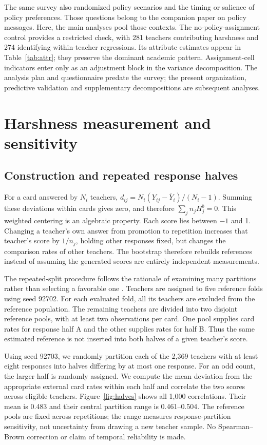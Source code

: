 The same survey also randomized policy scenarios and the timing or salience of policy preferences. Those questions belong to the companion paper on policy messages. Here, the main analyses pool those contexts. The no-policy-assignment control provides a restricted check, with 281 teachers contributing harshness and 274 identifying within-teacher regressions. Its attribute estimates appear in Table~\ref{tab:attr}; they preserve the dominant academic pattern. Assignment-cell indicators enter only as an adjustment block in the variance decomposition. The analysis plan and questionnaire predate the survey; the present organization, predictive validation and supplementary decompositions are subsequent analyses.

\section{Harshness measurement and sensitivity}\label{app:harshness}
\subsection{Construction and repeated response halves}
For a card answered by $N_i$ teachers, $d_{ij}=N_i(Y_{ij}-\overline Y_i)/(N_i-1)$. Summing these deviations within cards gives zero, and therefore $\sum_j n_jH^b_j=0$. This weighted centering is an algebraic property. Each score lies between $-1$ and 1. Changing a teacher's own answer from promotion to repetition increases that teacher's score by $1/n_j$, holding other responses fixed, but changes the comparison rates of other teachers. The bootstrap therefore rebuilds references instead of assuming the generated scores are entirely independent measurements.

The repeated-split procedure follows the rationale of examining many partitions rather than selecting a favorable one \cite{parsons}. Teachers are assigned to five reference folds using seed 92702. For each evaluated fold, all its teachers are excluded from the reference population. The remaining teachers are divided into two disjoint reference pools, with at least two observations per card. One pool supplies card rates for response half A and the other supplies rates for half B. Thus the same estimated reference is not inserted into both halves of a given teacher's score.

Using seed 92703, we randomly partition each of the 2,369 teachers with at least eight responses into halves differing by at most one response. For an odd count, the larger half is randomly assigned. We compute the mean deviation from the appropriate external card rates within each half and correlate the two scores across eligible teachers. Figure~\ref{fig:halves} shows all 1,000 correlations. Their mean is 0.483 and their central partition range is 0.461--0.504. The reference pools are fixed across repetitions; the range measures response-partition sensitivity, not uncertainty from drawing a new teacher sample. No Spearman--Brown correction or claim of temporal reliability is made.

